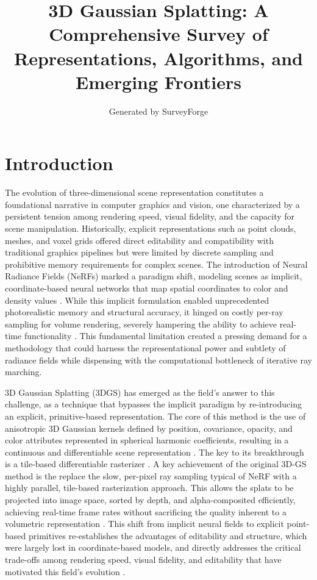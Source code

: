 \documentclass[11pt,a4paper]{article}
\title{3D Gaussian Splatting: A Comprehensive Survey of Representations, Algorithms, and Emerging Frontiers}
\author{Generated by SurveyForge}
\date{}
\begin{document}
\maketitle
\tableofcontents
\newpage



\section{Introduction}


The evolution of three-dimensional scene representation constitutes a foundational narrative in computer graphics and vision, one characterized by a persistent tension among rendering speed, visual fidelity, and the capacity for scene manipulation. Historically, explicit representations such as point clouds, meshes, and voxel grids offered direct editability and compatibility with traditional graphics pipelines but were limited by discrete sampling and prohibitive memory requirements for complex scenes. The introduction of Neural Radiance Fields (NeRFs) marked a paradigm shift, modeling scenes as implicit, coordinate-based neural networks that map spatial coordinates to color and density values \cite{arxiv:2401.03890v2,arxiv:2407.17418v1}. While this implicit formulation enabled unprecedented photorealistic memory and structural accuracy, it hinged on costly per-ray sampling for volume rendering, severely hampering the ability to achieve real-time functionality \cite{arxiv:2403.11134v2,arxiv:2401.03890v2}. This fundamental limitation created a pressing demand for a methodology that could harness the representational power and subtlety of radiance fields while dispensing with the computational bottleneck of iterative ray marching.

3D Gaussian Splatting (3DGS) has emerged as the field's answer to this challenge, as a technique that bypasses the implicit paradigm by re-introducing an explicit, primitive-based representation. The core of this method is the use of anisotropic 3D Gaussian kernels defined by position, covariance, opacity, and color attributes represented in spherical harmonic coefficients, resulting in a continuous and differentiable scene representation \cite{arxiv:2407.17418v1}. The key to its breakthrough is a tile-based differentiable rasterizer \cite{arxiv:2510.26694v1}. A key achievement of the original 3D-GS method is the replace the slow, per-pixel ray sampling typical of NeRF with a highly parallel, tile-based rasterization approach. This allows the splats to be projected into image space, sorted by depth, and alpha-composited efficiently, achieving real-time frame rates without sacrificing the quality inherent to a volumetric representation \cite{arxiv:2510.18101v1}. This shift from implicit neural fields to explicit point-based primitives re-establishes the advantages of editability and structure, which were largely lost in coordinate-based models, and directly addresses the critical trade-offs among rendering speed, visual fidelity, and editability that have motivated this field's evolution \cite{arxiv:2401.03890v2,arxiv:2401.03890v2}.
\end{document}
